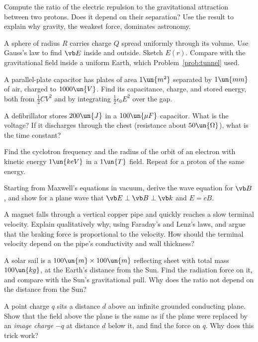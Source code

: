 \begin{problems}
\core \label{prob:coulomb-gravity} Compute the ratio of the electric repulsion to the gravitational attraction between two protons. Does it depend on their separation? Use the result to explain why gravity, the weakest force, dominates astronomy.

\core A sphere of radius $R$ carries charge $Q$ spread uniformly through its volume. Use Gauss's law to find $\vb E$ inside and outside. Sketch $E(r)$. Compare with the gravitational field inside a uniform Earth, which Problem~\ref{prob:tunnel} used.

 A parallel-plate capacitor has plates of area $1\un{m^2}$ separated by $1\un{mm}$ of air, charged to $1000\un{V}$. Find its capacitance, charge, and stored energy, both from $\tfrac12CV^2$ and by integrating $\tfrac12\epsilon_0E^2$ over the gap.

 A defibrillator stores $200\un{J}$ in a $100\un{\mu F}$ capacitor. What is the voltage? If it discharges through the chest (resistance about $50\un{\Omega}$), what is the time constant?

 Find the cyclotron frequency and the radius of the orbit of an electron with kinetic energy $1\un{keV}$ in a $1\un{T}$ field. Repeat for a proton of the same energy.

\core Starting from Maxwell's equations in vacuum, derive the wave equation for $\vb B$, and show for a plane wave that $\vb E\perp\vb B\perp\vb k$ and $E = cB$.

 A magnet falls through a vertical copper pipe and quickly reaches a slow terminal velocity. Explain qualitatively why, using Faraday's and Lenz's laws, and argue that the braking force is proportional to the velocity. How should the terminal velocity depend on the pipe's conductivity and wall thickness?

 A solar sail is a $100\un{m}\times100\un{m}$ reflecting sheet with total mass $100\un{kg}$, at the Earth's distance from the Sun. Find the radiation force on it, and compare with the Sun's gravitational pull. Why does the ratio not depend on the distance from the Sun?

 A point charge $q$ sits a distance $d$ above an infinite grounded conducting plane. Show that the field above the plane is the same as if the plane were replaced by an \emph{image charge} $-q$ at distance $d$ below it, and find the force on $q$. Why does this trick work?


\end{problems}
